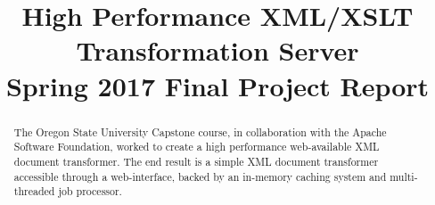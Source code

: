 

\makeglossaries

\renewcommand{\glossarysection}[2][]{}



\title{
	High Performance XML/XSLT Transformation Server \\
    {
    	\Large Spring 2017 Final Project Report
    }
}
\author{
}



\maketitle
\begin{abstract}
  The Oregon State University Capstone course, in collaboration with the Apache Software Foundation, worked to create a high performance web-available XML document transformer.
  The end result is a simple XML document transformer accessible through a web-interface, backed by an in-memory caching system and multi-threaded job processor.
\end{abstract}

